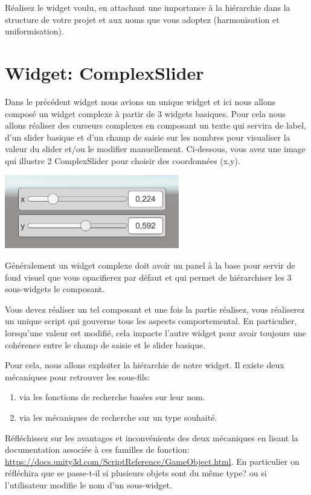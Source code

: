 \documentclass[a4paper,10pt]{article}
\newenvironment{info}%
{\begin{tcolorbox}[breakable,colback=green!5!white,colframe=green!75!black,title=Information]}%
{\end{tcolorbox}}
\begin{document}
Réalisez le widget voulu, en attachant une importance à la hiérarchie dans la structure de votre projet et aux noms que vous adoptez (harmonisation et uniformisation).

\section{Widget: ComplexSlider}

Dans le précédent widget nous avions un unique widget et ici nous allons composé un widget complexe à partir de 3 widgets basiques. Pour cela nous allons réaliser des curseurs complexes en composant un texte qui servira de label, d'un slider basique et d'un champ de saisie sur les nombres pour visualiser la valeur du slider et/ou le modifier manuellement. Ci-dessous, vous avez une image qui illustre 2 ComplexSlider pour choisir des coordonnées (x,y).

\begin{center}
	\includegraphics[width=0.5\linewidth]{rc/widget_complexslider_demo}
\end{center}

\begin{info}
Généralement un widget complexe doit avoir un panel à la base pour servir de fond visuel que vous opacifierez par défaut et qui permet de hiérarchiser les 3 sous-widgets le composant.
\end{info}

Vous devez réaliser un tel composant et une fois la partie réalisez, vous réaliserez un unique script qui gouverne tous les aspects comportemental. En particulier, lorsqu'une valeur est modifié, cela impacte l'autre widget pour avoir toujours une cohérence entre le champ de saisie et le slider basique.

Pour cela, nous allons exploiter la hiérarchie de notre widget. Il existe deux mécaniques pour retrouver les sous-fils:
\begin{enumerate}
	\item via les fonctions de recherche basées sur leur nom. 
	\item via les mécaniques de recherche sur un type souhaité.
\end{enumerate}
Réfléchissez sur les avantages et inconvénients des deux mécaniques en lisant la documentation associée à ces familles de fonction: \url{https://docs.unity3d.com/ScriptReference/GameObject.html}.
En particulier on réfléchira que se passe-t-il si plusieurs objets sont du même type? ou si l'utilisateur modifie le nom d'un sous-widget.
\end{document}
